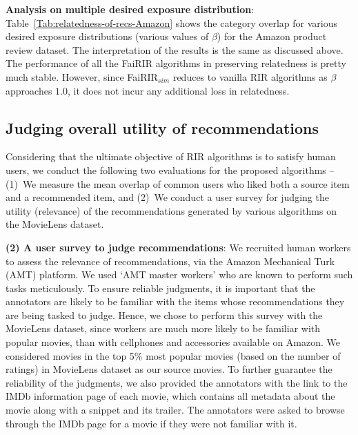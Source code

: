 \noindent
\textbf{Analysis on multiple desired exposure distribution}: Table~\ref{Tab:relatedness-of-recs-Amazon} shows the category overlap for various desired exposure distributions (various values of $\beta$) for the Amazon product review dataset. The interpretation of the results is the same as discussed above. The performance of all the FaiRIR algorithms in preserving relatedness is pretty much stable. 
However, since FaiRIR$_{sim}$ reduces to vanilla RIR algorithms as $\beta$ approaches $1.0$, it does not incur any additional loss in %
relatedness.




\vspace{-1 mm}
\subsection{Judging overall utility of recommendations} %
\label{sec: user_survey}
Considering that the ultimate objective of RIR algorithms is to satisfy human users, we conduct the following two evaluations for the proposed algorithms -- 
(1)~We measure the mean overlap of common users who liked both a source item and a recommended item, and 
(2)~We conduct a user survey for judging the utility (relevance) of the recommendations generated by various algorithms on the MovieLens dataset.



\vspace{2mm}
\noindent \textbf{(2) A user survey to judge recommendations}: 
We recruited human workers to assess the relevance of recommendations, via the Amazon Mechanical Turk (AMT) platform. 
We used `AMT master workers' who are known to perform such tasks meticulously. 
To ensure reliable judgments, it is important that the annotators are likely to be familiar with the items whose recommendations they are being tasked to judge.
Hence, we chose to perform this survey with the MovieLens dataset, since workers are much more likely to be familiar with popular movies, than with cellphones and accessories available on Amazon.
We considered movies in the top 5\% most popular movies (based on the number of ratings) in MovieLens dataset as our source movies. 
To further guarantee the reliability of the judgments, we also provided the annotators with the link to the IMDb information page of each movie, which contains all metadata about the movie along with a snippet and its trailer. 
The annotators were asked to browse through the IMDb page for a movie if they were not familiar with it.

